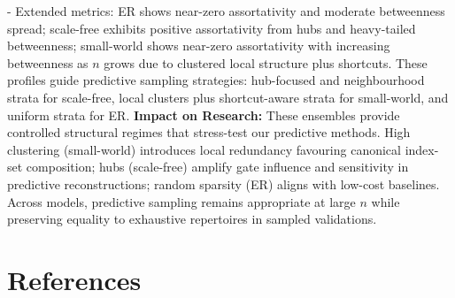 \documentclass{article}
\begin{document}
 - Extended metrics: ER shows near-zero assortativity and moderate betweenness spread; scale-free exhibits positive assortativity from hubs and heavy-tailed betweenness; small-world shows near-zero assortativity with increasing betweenness as $n$ grows due to clustered local structure plus shortcuts. These profiles guide predictive sampling strategies: hub-focused and neighbourhood strata for scale-free, local clusters plus shortcut-aware strata for small-world, and uniform strata for ER.
\textbf{Impact on Research:} These ensembles provide controlled structural regimes that stress-test our predictive methods. High clustering (small-world) introduces local redundancy favouring canonical index-set composition; hubs (scale-free) amplify gate influence and sensitivity in predictive reconstructions; random sparsity (ER) aligns with low-cost baselines. Across models, predictive sampling remains appropriate at large $n$ while preserving equality to exhaustive repertoires in sampled validations.

\section{References}
\end{document}
